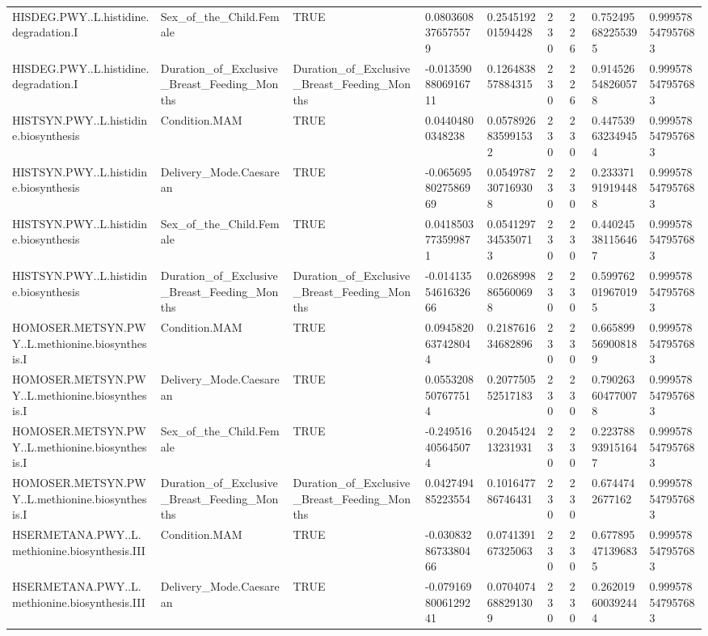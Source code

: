 \begin{longtable}{lllllllll}
HISDEG.PWY..L.histidine.degradation.I & Sex\_of\_the\_Child.Female & TRUE & 0.0803608376575579 & 0.254519201594428 & 230 & 226 & 0.752495682255395 & 0.999578547957683 \\
HISDEG.PWY..L.histidine.degradation.I & Duration\_of\_Exclusive\_Breast\_Feeding\_Months & Duration\_of\_Exclusive\_Breast\_Feeding\_Months & -0.0135908806916711 & 0.126483857884315 & 230 & 226 & 0.914526548260578 & 0.999578547957683 \\
HISTSYN.PWY..L.histidine.biosynthesis & Condition.MAM & TRUE & 0.04404800348238 & 0.0578926835991532 & 230 & 230 & 0.447539632349454 & 0.999578547957683 \\
HISTSYN.PWY..L.histidine.biosynthesis & Delivery\_Mode.Caesarean & TRUE & -0.0656958027586969 & 0.0549787307169308 & 230 & 230 & 0.233371919194488 & 0.999578547957683 \\
HISTSYN.PWY..L.histidine.biosynthesis & Sex\_of\_the\_Child.Female & TRUE & 0.0418503773599871 & 0.0541297345350713 & 230 & 230 & 0.440245381156467 & 0.999578547957683 \\
HISTSYN.PWY..L.histidine.biosynthesis & Duration\_of\_Exclusive\_Breast\_Feeding\_Months & Duration\_of\_Exclusive\_Breast\_Feeding\_Months & -0.0141355461632666 & 0.0268998865600698 & 230 & 230 & 0.599762019670195 & 0.999578547957683 \\
HOMOSER.METSYN.PWY..L.methionine.biosynthesis.I & Condition.MAM & TRUE & 0.0945820637428044 & 0.218761634682896 & 230 & 230 & 0.665899569008189 & 0.999578547957683 \\
HOMOSER.METSYN.PWY..L.methionine.biosynthesis.I & Delivery\_Mode.Caesarean & TRUE & 0.0553208507677514 & 0.207750552517183 & 230 & 230 & 0.790263604770078 & 0.999578547957683 \\
HOMOSER.METSYN.PWY..L.methionine.biosynthesis.I & Sex\_of\_the\_Child.Female & TRUE & -0.249516405645074 & 0.204542413231931 & 230 & 230 & 0.223788939151647 & 0.999578547957683 \\
HOMOSER.METSYN.PWY..L.methionine.biosynthesis.I & Duration\_of\_Exclusive\_Breast\_Feeding\_Months & Duration\_of\_Exclusive\_Breast\_Feeding\_Months & 0.042749485223554 & 0.101647786746431 & 230 & 230 & 0.6744742677162 & 0.999578547957683 \\
HSERMETANA.PWY..L.methionine.biosynthesis.III & Condition.MAM & TRUE & -0.0308328673380466 & 0.074139167325063 & 230 & 230 & 0.677895471396835 & 0.999578547957683 \\
HSERMETANA.PWY..L.methionine.biosynthesis.III & Delivery\_Mode.Caesarean & TRUE & -0.0791698006129241 & 0.0704074688291309 & 230 & 230 & 0.262019600392444 & 0.999578547957683 \\

\end{longtable}
